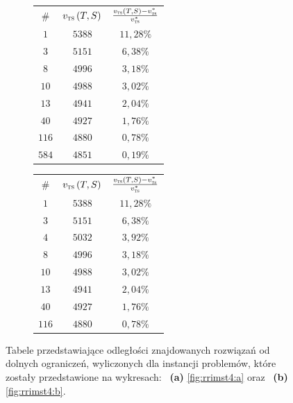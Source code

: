 \begin{figure}[!htbp]
	\null\hfill
	\begin{subfigure}[b]{0.3\textwidth}
		\centering
		\begin{tabular}{ccc}
			\hline
			\# & $v_{\textsc{ts}} \left( T, S \right)$ & $\frac{v_{\textsc{ts}} \left( T, S \right) - v_{\textsc{ts}}^{\ast}}{v_{\textsc{ts}}^{\ast}}$ \\
			$1$	&	$5388$	&	$11,28\%$	\\
			$3$	&	$5151$	&	$6,38\%$	\\
			$8$	&	$4996$	&	$3,18\%$	\\
			$10$	&	$4988$	&	$3,02\%$	\\
			$13$	&	$4941$	&	$2,04\%$	\\
			$40$	&	$4927$	&	$1,76\%$	\\
			$116$	&	$4880$	&	$0,78\%$	\\
			$584$	&	$4851$	&	$0,19\%$ \\\hline                                                                                                    
		\end{tabular}
		\caption{}
		\label{fig:rrimst4tab:a}
	\end{subfigure}
	\hfill
	\begin{subfigure}[b]{0.3\textwidth}
		\centering
		\begin{tabular}{ccc}
			\hline
			\# & $v_{\textsc{ts}} \left( T, S \right)$ & $\frac{v_{\textsc{ts}} \left( T, S \right) - v_{\textsc{ts}}^{\ast}}{v_{\textsc{ts}}^{\ast}}$ \\
			$1$	&	$5388$	&	$11,28\%$	\\
			$3$	&	$5151$	&	$6,38\%$	\\
			$4$	&	$5032$	&	$3,92\%$	\\
			$8$	&	$4996$	&	$3,18\%$	\\
			$10$	&	$4988$	&	$3,02\%$	\\
			$13$	&	$4941$	&	$2,04\%$	\\
			$40$	&	$4927$	&	$1,76\%$	\\
			$116$	&	$4880$	&	$0,78\%$	\\\hline                                                                                                  
		\end{tabular}
		\caption{}
		\label{fig:rrimst4tab:b}
	\end{subfigure}
	\hfill\null
	\caption{
		Tabele przedstawiające odległości znajdowanych rozwiązań od dolnych ograniczeń, wyliczonych dla instancji problemów, które zostały przedstawione na wykresach: ~\textbf{(a)} \ref{fig:rrimst4:a} oraz ~\textbf{(b)} \ref{fig:rrimst4:b}.
	}
	\label{fig:rrimst4tab}
\end{figure}